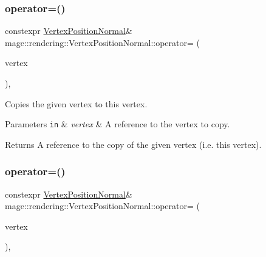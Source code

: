 \subsubsection{\texorpdfstring{operator=()}{operator=()}\hspace{0.1cm}{\footnotesize\ttfamily [1/2]}}
{\footnotesize\ttfamily constexpr \mbox{\hyperlink{structmage_1_1rendering_1_1_vertex_position_normal}{Vertex\+Position\+Normal}}\& mage\+::rendering\+::\+Vertex\+Position\+Normal\+::operator= (\begin{DoxyParamCaption}\item[{const \mbox{\hyperlink{structmage_1_1rendering_1_1_vertex_position_normal}{Vertex\+Position\+Normal}} \&}]{vertex }\end{DoxyParamCaption})\hspace{0.3cm}{\ttfamily [default]}, {\ttfamily [noexcept]}}

Copies the given vertex to this vertex.


\begin{DoxyParams}[1]{Parameters}
\mbox{\tt in}  & {\em vertex} & A reference to the vertex to copy. \\
\hline
\end{DoxyParams}
\begin{DoxyReturn}{Returns}
A reference to the copy of the given vertex (i.\+e. this vertex). 
\end{DoxyReturn}
\mbox{\label{structmage_1_1rendering_1_1_vertex_position_normal_ab91c35523dc03eb777f572853b4be633}} 
\subsubsection{\texorpdfstring{operator=()}{operator=()}\hspace{0.1cm}{\footnotesize\ttfamily [2/2]}}
{\footnotesize\ttfamily constexpr \mbox{\hyperlink{structmage_1_1rendering_1_1_vertex_position_normal}{Vertex\+Position\+Normal}}\& mage\+::rendering\+::\+Vertex\+Position\+Normal\+::operator= (\begin{DoxyParamCaption}\item[{\mbox{\hyperlink{structmage_1_1rendering_1_1_vertex_position_normal}{Vertex\+Position\+Normal}} \&\&}]{vertex }\end{DoxyParamCaption})\hspace{0.3cm}{\ttfamily [default]}, {\ttfamily [noexcept]}}


